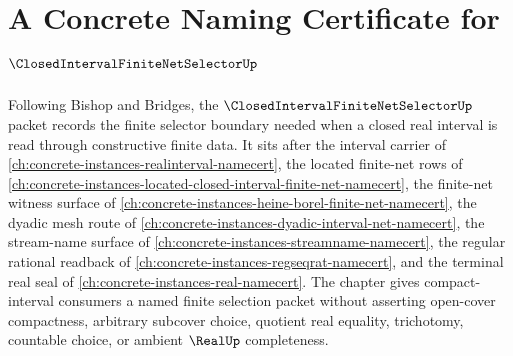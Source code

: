 \chapter{A Concrete Naming Certificate for $\ClosedIntervalFiniteNetSelectorUp$}
\label{ch:concrete-instances-closed-interval-finite-net-selector-namecert}

Following Bishop and Bridges, the $\ClosedIntervalFiniteNetSelectorUp$ packet records the finite selector boundary needed when a closed real interval is read through constructive finite data. It sits after the interval carrier of \autoref{ch:concrete-instances-realinterval-namecert}, the located finite-net rows of \autoref{ch:concrete-instances-located-closed-interval-finite-net-namecert}, the finite-net witness surface of \autoref{ch:concrete-instances-heine-borel-finite-net-namecert}, the dyadic mesh route of \autoref{ch:concrete-instances-dyadic-interval-net-namecert}, the stream-name surface of \autoref{ch:concrete-instances-streamname-namecert}, the regular rational readback of \autoref{ch:concrete-instances-regseqrat-namecert}, and the terminal real seal of \autoref{ch:concrete-instances-real-namecert}. The chapter gives compact-interval consumers a named finite selection packet without asserting open-cover compactness, arbitrary subcover choice, quotient real equality, trichotomy, countable choice, or ambient $\RealUp$ completeness.

